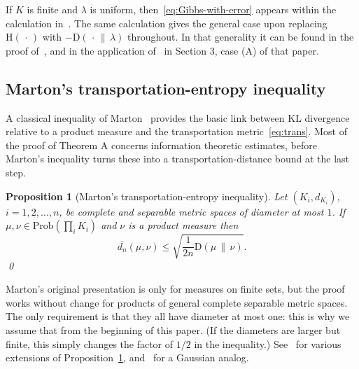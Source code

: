\documentclass[aop,preprint]{imsart}
\newtheorem{prop}[thm]{Proposition}
\theoremstyle{remark}
\renewcommand{\rm}[1]{\mathrm{#1}}
\newcommand{\rmH}{\mathrm{H}}
\renewcommand{\d}{\mathrm{d}}
\renewcommand{\l}{\lambda}
\newcommand{\ol}[1]{\overline{#1}}
\renewcommand{\Pr}{\rm{Prob}}
\newcommand{\rmD}{\mathrm{D}}
\begin{document}
If $K$ is finite and $\l$ is uniform, then~\eqref{eq:Gibbs-with-error} appears within the calculation in~\cite[equations (12.5)--(12.12)]{CovTho06}.  The same calculation gives the general case upon replacing $\rmH(\,\cdot\,)$ with $-\rmD(\,\cdot\,\|\,\l)$ throughout.  In that generality it can be found in the proof of~\cite[Lemma 6.2.13]{DemZei--LDPbook}, and in the application of~\cite[equation~(2.6)]{Csi75} in Section 3, case (A) of that paper.








\subsection{Marton's transportation-entropy inequality}\label{subs:Marton}

A classical inequality of Marton~\cite{Mar86,Mar96} provides the basic link between KL divergence relative to a product measure and the transportation metric~\eqref{eq:trans}.  Most of the proof of Theorem A concerns information theoretic estimates, before Marton's inequality turns these into a transportation-distance bound at the last step.

\begin{prop}[Marton's transportation-entropy inequality]\label{prop:Marton}
	Let $(K_i,d_{K_i})$, $i=1,2,\dots,n$, be complete and separable metric spaces of diameter at most $1$.  If $\mu,\nu \in \Pr(\prod_i K_i)$ and $\nu$ is a product measure then
	\[\ol{d_n}(\mu,\nu) \leq \sqrt{\frac{1}{2n}\rmD(\mu\,\|\,\nu)}.\]
	\qed
\end{prop}

Marton's original presentation is only for measures on finite sets, but the proof works without change for products of general complete separable metric spaces. The only requirement is that they all have diameter at most one: this is why we assume that from the beginning of this paper.  (If the diameters are larger but finite, this simply changes the factor of $1/2$ in the inequality.)  See~\cite{Mar96,Mar98,Dem97,Sam00} for various extensions of Proposition~\ref{prop:Marton}, and~\cite{Tal96b} for a Gaussian analog.
\end{document}
